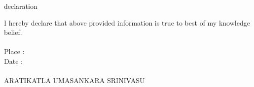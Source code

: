\documentclass{resume} %
\begin{document}
\begin{rSection}{declaration}

{I hereby declare that above provided information is true  to best of my knowledge belief.\\}
{\\Place : \\ Date : \\}
{\\ \hfill ARATIKATLA UMASANKARA SRINIVASU}

\end{rSection}
\end{document}
